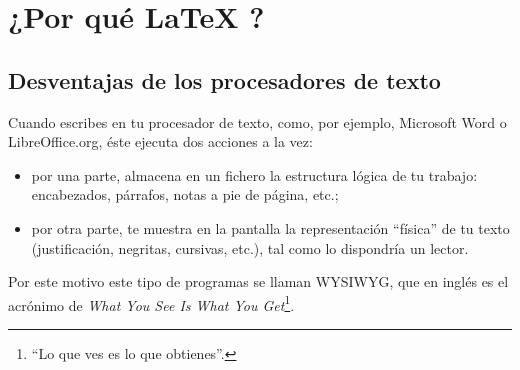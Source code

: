 \section{¿Por qué \LaTeX{} ?}

\subsection{Desventajas de los procesadores de texto}

Cuando escribes en tu procesador de texto, como, por ejemplo, Microsoft Word o LibreOffice.org, éste ejecuta dos acciones a la vez:
\begin{itemize}
\item por una parte, almacena en un fichero la estructura lógica de tu trabajo: encabezados, párrafos, notas a pie de página, etc.;
\item por otra parte, te muestra en la pantalla la representación \enquote{física} de tu texto (justificación, negritas, cursivas, etc.), tal como lo dispondría un lector.
\end{itemize}

Por este motivo este tipo de programas se llaman WYSIWYG, que en inglés es el acrónimo de \textenglish{\emph{What You See Is What You Get}}\footnote{\enquote{Lo que ves es lo que obtienes}.}. 

